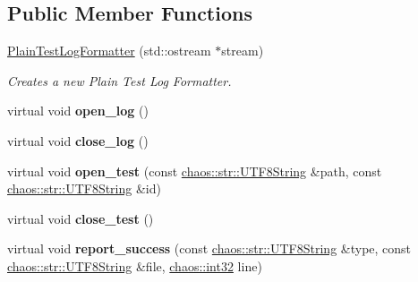 \subsection*{Public Member Functions}
\begin{DoxyCompactItemize}
\item 
\hypertarget{classchaos_1_1test_1_1log__formatter_1_1_plain_test_log_formatter_a728fd3a47d5ff50e84f2ab6a39cbfa87}{}\hyperlink{classchaos_1_1test_1_1log__formatter_1_1_plain_test_log_formatter_a728fd3a47d5ff50e84f2ab6a39cbfa87}{Plain\+Test\+Log\+Formatter} (std\+::ostream $\ast$stream)\label{classchaos_1_1test_1_1log__formatter_1_1_plain_test_log_formatter_a728fd3a47d5ff50e84f2ab6a39cbfa87}

\begin{DoxyCompactList}\small\item\em Creates a new Plain Test Log Formatter. \end{DoxyCompactList}\item 
\hypertarget{classchaos_1_1test_1_1log__formatter_1_1_plain_test_log_formatter_abdf1f9a1a7099f1af520b6dcc9c344b1}{}virtual void {\bfseries open\+\_\+log} ()\label{classchaos_1_1test_1_1log__formatter_1_1_plain_test_log_formatter_abdf1f9a1a7099f1af520b6dcc9c344b1}

\item 
\hypertarget{classchaos_1_1test_1_1log__formatter_1_1_plain_test_log_formatter_ad16ae535433e998b2af10ec0a2af329f}{}virtual void {\bfseries close\+\_\+log} ()\label{classchaos_1_1test_1_1log__formatter_1_1_plain_test_log_formatter_ad16ae535433e998b2af10ec0a2af329f}

\item 
\hypertarget{classchaos_1_1test_1_1log__formatter_1_1_plain_test_log_formatter_ae1e5cce2f2e5407cd619855c3daf18a8}{}virtual void {\bfseries open\+\_\+test} (const \hyperlink{classchaos_1_1str_1_1_u_t_f8_string}{chaos\+::str\+::\+U\+T\+F8\+String} \&path, const \hyperlink{classchaos_1_1str_1_1_u_t_f8_string}{chaos\+::str\+::\+U\+T\+F8\+String} \&id)\label{classchaos_1_1test_1_1log__formatter_1_1_plain_test_log_formatter_ae1e5cce2f2e5407cd619855c3daf18a8}

\item 
\hypertarget{classchaos_1_1test_1_1log__formatter_1_1_plain_test_log_formatter_aa6ff58563cec81e203461286504612f3}{}virtual void {\bfseries close\+\_\+test} ()\label{classchaos_1_1test_1_1log__formatter_1_1_plain_test_log_formatter_aa6ff58563cec81e203461286504612f3}

\item 
\hypertarget{classchaos_1_1test_1_1log__formatter_1_1_plain_test_log_formatter_a6ff953811ac8bce5b8ac79610bf06424}{}virtual void {\bfseries report\+\_\+success} (const \hyperlink{classchaos_1_1str_1_1_u_t_f8_string}{chaos\+::str\+::\+U\+T\+F8\+String} \&type, const \hyperlink{classchaos_1_1str_1_1_u_t_f8_string}{chaos\+::str\+::\+U\+T\+F8\+String} \&file, \hyperlink{namespacechaos_ad1de7efb430365afd2c9446a0f522a90}{chaos\+::int32} line)\label{classchaos_1_1test_1_1log__formatter_1_1_plain_test_log_formatter_a6ff953811ac8bce5b8ac79610bf06424}


\end{DoxyCompactItemize}
